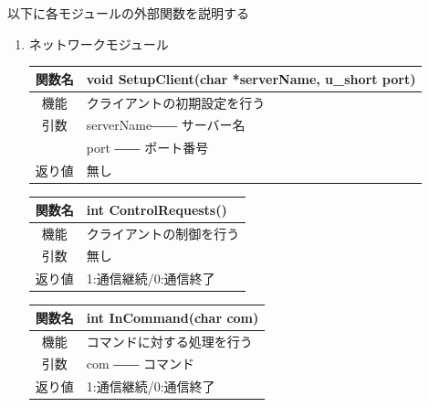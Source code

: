 \documentclass{jarticle}
\begin{document}
以下に各モジュールの外部関数を説明する
\begin{enumerate}
    \item ネットワークモジュール
    \begin{table}[H]
        \label{table:fanc_c1-1}
        \begin{center}
            \begin{tabular}{|c||p{30em}|}\hline
                関数名&void SetupClient(char *serverName, u\_short port) \\\hline
                機能&クライアントの初期設定を行う\\
                引数&serverName―― サーバー名\\
                &port ―― ポート番号\\
                返り値&無し\\\hline
            \end{tabular}
        \end{center}
    \end{table}
    \begin{table}[H]
        \label{table:fanc_c1-2}
        \begin{center}
            \begin{tabular}{|c||p{30em}|}\hline
                関数名&int ControlRequests() \\\hline
                機能&クライアントの制御を行う\\
                引数&無し\\
                返り値&1:通信継続/0:通信終了\\\hline
            \end{tabular}
        \end{center}
    \end{table}
    \begin{table}[H]
        \label{table:fanc_c1-3}
        \begin{center}
            \begin{tabular}{|c||p{30em}|}\hline
                関数名&int InCommand(char com) \\\hline
                機能&コマンドに対する処理を行う\\
                引数&com ―― コマンド\\
                返り値&1:通信継続/0:通信終了\\\hline
            \end{tabular}
        \end{center}
    \end{table}

\end{enumerate}
\end{document}
